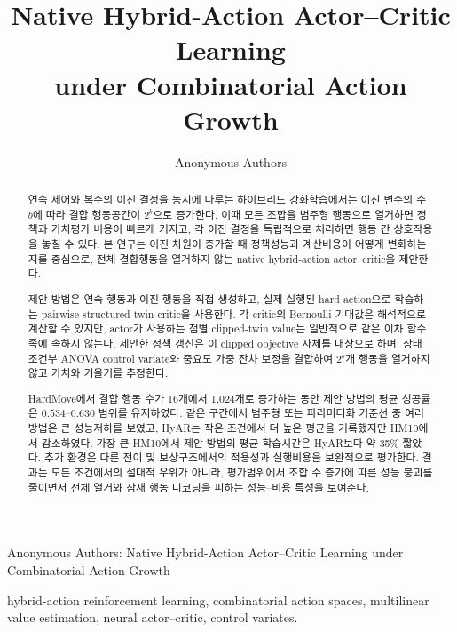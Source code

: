 \documentclass[10pt,journal]{IEEEtran}
\begin{document}
\title{Native Hybrid-Action Actor--Critic Learning\\
under Combinatorial Action Growth}

\author{Anonymous Authors}

%
{Anonymous Authors: Native Hybrid-Action Actor--Critic Learning under Combinatorial Action Growth}

\maketitle


\begin{abstract}
연속 제어와 복수의 이진 결정을 동시에 다루는 하이브리드 강화학습에서는 이진 변수의 수 $b$에 따라 결합 행동공간이 $2^b$으로 증가한다. 이때 모든 조합을 범주형 행동으로 열거하면 정책과 가치평가 비용이 빠르게 커지고, 각 이진 결정을 독립적으로 처리하면 행동 간 상호작용을 놓칠 수 있다. 본 연구는 이진 차원이 증가할 때 정책성능과 계산비용이 어떻게 변화하는지를 중심으로, 전체 결합행동을 열거하지 않는 native hybrid-action actor--critic을 제안한다.

제안 방법은 연속 행동과 이진 행동을 직접 생성하고, 실제 실행된 hard action으로 학습하는 pairwise structured twin critic을 사용한다. 각 critic의 Bernoulli 기대값은 해석적으로 계산할 수 있지만, actor가 사용하는 점별 clipped-twin value는 일반적으로 같은 이차 함수족에 속하지 않는다. 제안한 정책 갱신은 이 clipped objective 자체를 대상으로 하며, 상태 조건부 ANOVA control variate와 중요도 가중 잔차 보정을 결합하여 $2^b$개 행동을 열거하지 않고 가치와 기울기를 추정한다.

HardMove에서 결합 행동 수가 16개에서 1,024개로 증가하는 동안 제안 방법의 평균 성공률은 $0.534$--$0.630$ 범위를 유지하였다. 같은 구간에서 범주형 또는 파라미터화 기준선 중 여러 방법은 큰 성능저하를 보였고, HyAR는 작은 조건에서 더 높은 평균을 기록했지만 HM10에서 감소하였다. 가장 큰 HM10에서 제안 방법의 평균 학습시간은 HyAR보다 약 35\% 짧았다. 추가 환경은 다른 전이 및 보상구조에서의 적용성과 실행비용을 보완적으로 평가한다. 결과는 모든 조건에서의 절대적 우위가 아니라, 평가범위에서 조합 수 증가에 따른 성능 붕괴를 줄이면서 전체 열거와 잠재 행동 디코딩을 피하는 성능--비용 특성을 보여준다.
\end{abstract}

\begin{IEEEkeywords}
hybrid-action reinforcement learning, combinatorial action spaces,
multilinear value estimation, neural actor--critic, control variates.
\end{IEEEkeywords}
\end{document}
